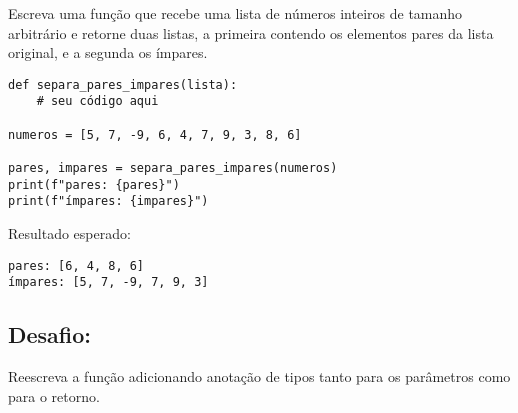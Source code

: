 Escreva uma função que recebe uma lista de números inteiros de tamanho arbitrário e retorne duas listas, a primeira
contendo os elementos pares da lista original, e a segunda os ímpares.
\begin{verbatim}
def separa_pares_impares(lista):
    # seu código aqui

numeros = [5, 7, -9, 6, 4, 7, 9, 3, 8, 6]

pares, impares = separa_pares_impares(numeros)
print(f"pares: {pares}")
print(f"ímpares: {impares}")
\end{verbatim}

Resultado esperado:
\begin{verbatim}
pares: [6, 4, 8, 6]
ímpares: [5, 7, -9, 7, 9, 3]
\end{verbatim}

\subsection*{Desafio:}
Reescreva a função adicionando anotação de tipos tanto para os parâmetros como para o retorno.